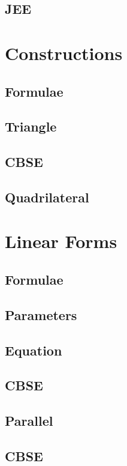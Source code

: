 \documentclass[journal]{IEEEtran}
\begin{document}
\subsection{JEE}

\newpage
\section{Constructions}
\subsection{Formulae}

\subsection{Triangle}

\subsection{CBSE}

\subsection{Quadrilateral}

\newpage
\section{Linear Forms}
\subsection{Formulae}

\subsection{Parameters}

\subsection{Equation }

\subsection{CBSE}

\subsection{Parallel}

\subsection{CBSE}

\end{document}
